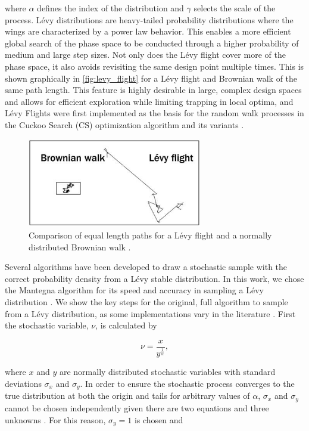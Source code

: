 \documentclass{article}                                                                           %
\begin{document}
\noindent where $\alpha$ defines the index of the distribution and $\gamma$ selects the scale of the process. 
Lévy distributions are heavy-tailed probability distributions where the wings are characterized by a power law behavior.   
This enables a more efficient global search of the phase space to be conducted through a higher probability of medium and large step sizes. 
Not only does the Lévy flight cover more of the phase space, it also avoids revisiting the same design point multiple times.  
This is shown graphically in \autoref{fig:levy_flight} for a Lévy flight and Brownian walk of the same path length. 
This feature is highly desirable in large, complex design spaces and allows for efficient exploration while limiting trapping in local optima, and Lévy Flights were first implemented as the basis for the random walk processes in the Cuckoo Search (CS) optimization algorithm and its variants \cite{Yang2009}. 
       
\begin{figure}[!t]
  \centering
  \includegraphics[width=3.0in]{../figs/Levy_Brownian}
  \caption{Comparison of equal length paths for a Lévy flight and a normally distributed Brownian walk \cite{Witze2010}.}
  \label{fig:levy_flight}
\end{figure}

Several algorithms have been developed to draw a stochastic sample with the correct probability density from a Lévy stable distribution.
In this work, we chose the Mantegna algorithm for its speed and accuracy in sampling a Lévy distribution \cite{Levy1994, Pantaleo2009}.
We show the key steps for the original, full algorithm to sample from a Lévy distribution, as some implementations vary in the literature \cite{Yang2009, Levy1994}.  
First the stochastic variable, $\nu$, is calculated by 

\begin{equation} \label{eq:Levy_1}
  \nu=\frac{x}{y^{\frac{1}{\alpha}}},
\end{equation}

\noindent where $x$ and $y$ are normally distributed stochastic variables with standard deviations $\sigma_x$ and $\sigma_y$.
In order to ensure the stochastic process converges to the true distribution at both the origin and tails for arbitrary values of $\alpha$, $\sigma_x$ and $\sigma_y$ cannot be chosen independently given there are two equations and three unknowns \cite{Mantegna1994}.
For this reason, $\sigma_y=1$ is chosen and 
\end{document}
